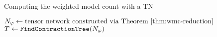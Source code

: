 \begin{algorithm*}[t]
    \label{alg:wmc}
    \caption{Computing the weighted model count with a TN}
    \DontPrintSemicolon
    $N_\varphi \gets \text{tensor network constructed via Theorem \ref{thm:wmc-reduction}}$\;
    $T \gets \texttt{\upshape FindContractionTree}(N_\varphi)$ 
\end{algorithm*}



